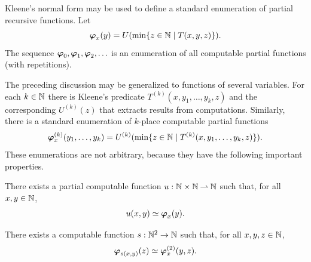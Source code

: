 Kleene's normal form may be used to define a standard enumeration of
partial recursive functions. Let
%
\begin{equation*}
  \text{\boldmath{$\varphi$}}_{x}(y) = U(\min \{z \in \mathbb{N} \mid T(x,y,z)\}).
\end{equation*}
%
The sequence $\text{\boldmath{$\varphi$}}_0, \text{\boldmath{$\varphi$}}_1, \text{\boldmath{$\varphi$}}_2, \ldots$ is an enumeration of all
computable partial functions (with repetitions).

The preceding discussion may be generalized to functions of several
variables. For each $k \in \mathbb{N}$ there is Kleene's predicate
$T^{(k)}(x,y_1,\ldots,y_k,z)$ and the corresponding $U^{(k)}(z)$ that
extracts results from computations. Similarly, there is a standard
enumeration of $k$-place computable partial functions
%
\begin{equation*}
  \text{\boldmath{$\varphi$}}^{(k)}_{x}(y_1, \ldots, y_k) =
  U^{(k)}(\min \{z \in \mathbb{N} \mid T^{(k)}(x,y_1, \ldots, y_k,z)\}).
\end{equation*}
%
These enumerations are not arbitrary, because they have the following
important properties.

\begin{theorem}[utm]
  There exists a partial computable function $u : \mathbb{N} \times
  \mathbb{N} \mathbin{\rightharpoonup} \mathbb{N}$ such that, for all $x, y \in \mathbb{N}$,
  \begin{equation*}
    u(x,y) \simeq \text{\boldmath{$\varphi$}}_{x}(y).
  \end{equation*}
\end{theorem}

\begin{theorem}[smn]
  There exists a computable function $s :
  \mathbb{N}^2 \to \mathbb{N}$ such that, for all $x, y, z \in \mathbb{N}$,
  \begin{equation*}
    \text{\boldmath{$\varphi$}}_{s(x, y)}(z) \simeq \text{\boldmath{$\varphi$}}^{(2)}_{x}(y,z).
  \end{equation*}
\end{theorem}

